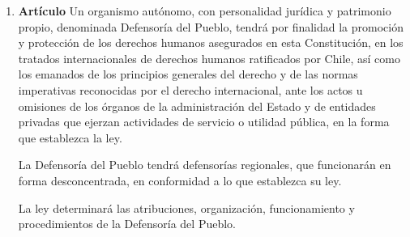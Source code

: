\documentclass[11pt, a4paper]{article}
\begin{document}
\begin{enumerate}
\item \textbf{Artículo} \newline
Un organismo autónomo, con personalidad jurídica y patrimonio propio, denominada Defensoría del Pueblo, tendrá por finalidad la promoción y protección de los derechos humanos asegurados en esta Constitución, en los tratados internacionales de derechos humanos ratificados por Chile, así como los emanados de los principios generales del derecho y de las normas imperativas reconocidas por el derecho internacional, ante los actos u omisiones de los órganos de la administración del Estado y de entidades privadas que ejerzan actividades de servicio o utilidad pública, en la forma que establezca la ley. 

La Defensoría del Pueblo tendrá defensorías regionales, que funcionarán en forma desconcentrada, en conformidad a lo que establezca su ley. 

La ley determinará las atribuciones, organización, funcionamiento y procedimientos de la Defensoría del Pueblo. 



\end{enumerate}
\end{document}
